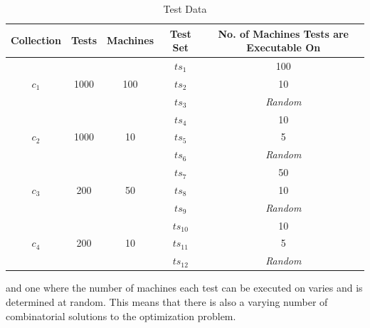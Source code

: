 \begin{landscape}
    \thispagestyle{plain}
    \vspace*{\fill}
    \begin{table}[h]
      \begin{tabular}{|c|c|c|c|c|}
        \hline
        \textbf{Collection} & \textbf{Tests} & \textbf{Machines} & \textbf{Test Set} & \textbf{No. of Machines Tests are Executable On}\\
        \hline
        \multirow{3}{*}{$c_1$} & \multirow{3}{*}{1000} & \multirow{3}{*}{100} & $ts_{1}$  & 100\\
                               &                       &                      & $ts_{2}$  & 10\\
                               &                       &                      & $ts_{3}$  & \emph{Random}\\
        \hline
        \multirow{3}{*}{$c_2$} & \multirow{3}{*}{1000} & \multirow{3}{*}{10}  & $ts_{4}$  & 10\\
                               &                       &                      & $ts_{5}$  & 5\\
                               &                       &                      & $ts_{6}$  & \emph{Random}\\
        \hline
        \multirow{3}{*}{$c_3$} & \multirow{3}{*}{200} & \multirow{3}{*}{50}   & $ts_{7}$  & 50\\
                               &                      &                       & $ts_{8}$  & 10\\
                               &                      &                       & $ts_{9}$  & \emph{Random}\\
        \hline
        \multirow{3}{*}{$c_4$} & \multirow{3}{*}{200} & \multirow{3}{*}{10}   & $ts_{10}$ & 10\\
                               &                      &                       & $ts_{11}$ & 5\\
                               &                      &                       & $ts_{12}$ & \emph{Random}\\
        \hline
      \end{tabular}
      \centering
      \caption{Test Data}
      \label{test_data}
    \end{table}
    \vspace*{\fill}
\end{landscape}

\noindent and one where the number of machines each test can be executed on varies and is determined at random. This means that there is also a varying number of combinatorial solutions to the optimization problem.

